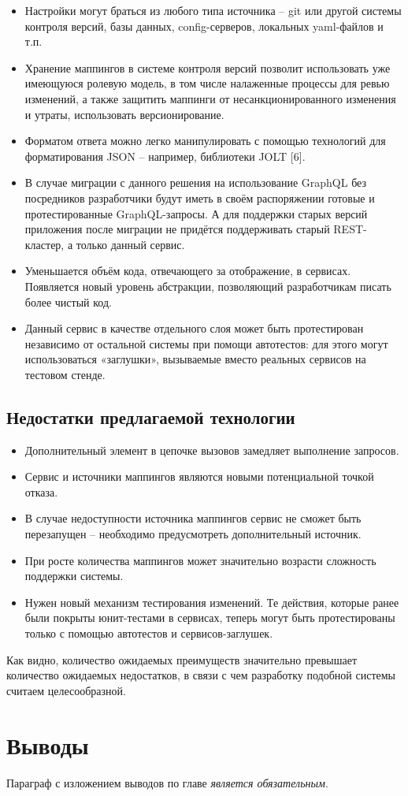 \begin{itemize}
	\item Настройки могут браться из любого типа источника – git или другой системы контроля версий, базы данных, config-серверов, локальных yaml-файлов и т.п.
	\item Хранение маппингов в системе контроля версий позволит использовать уже имеющуюся ролевую модель, в том числе налаженные процессы для ревью изменений, а также защитить маппинги от несанкционированного изменения и утраты, использовать версионирование.
	\item Форматом ответа можно легко манипулировать с помощью технологий для форматирования JSON – например, библиотеки JOLT [6].
	\item В случае миграции с данного решения на использование GraphQL без посредников разработчики будут иметь в своём распоряжении готовые и протестированные GraphQL-запросы.
	А для поддержки старых версий приложения после миграции не придётся поддерживать старый REST-кластер, а только данный сервис.
	\item Уменьшается объём кода, отвечающего за отображение, в сервисах.
	Появляется новый уровень абстракции, позволяющий разработчикам писать более чистый код.
	\item Данный сервис в качестве отдельного слоя может быть протестирован независимо от остальной системы при помощи автотестов: для этого могут использоваться «заглушки», вызываемые вместо реальных сервисов на тестовом стенде.
\end{itemize}

\subsection{Недостатки предлагаемой технологии}\label{subsec:proposed-technology-disadvantages}

\begin{itemize}
	\item Дополнительный элемент в цепочке вызовов замедляет выполнение запросов.
	\item Сервис и источники маппингов являются новыми потенциальной точкой отказа.
	\item В случае недоступности источника маппингов сервис не сможет быть перезапущен – необходимо предусмотреть дополнительный источник.
	\item При росте количества маппингов может значительно возрасти сложность поддержки системы.
	\item Нужен новый механизм тестирования изменений.
	Те действия, которые ранее были покрыты юнит-тестами в сервисах, теперь могут быть протестированы только с помощью автотестов и сервисов-заглушек.
\end{itemize}

Как видно, количество ожидаемых преимуществ значительно превышает количество ожидаемых недостатков, в связи с чем разработку подобной системы считаем целесообразной.

\section{Выводы} \label{sec:conclusion}

Параграф с изложением выводов по главе \textit{является обязательным}.